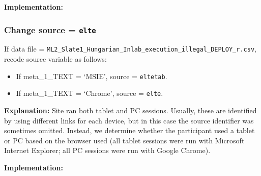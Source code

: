 \documentclass[]{article}
\newenvironment{Shaded}{\begin{snugshade}}{\end{snugshade}}
\newcommand{\DecValTok}[1]{\textcolor[rgb]{0.86,0.86,0.80}{{#1}}}
\newcommand{\StringTok}[1]{\textcolor[rgb]{0.80,0.58,0.58}{{#1}}}
\newcommand{\CommentTok}[1]{\textcolor[rgb]{0.50,0.62,0.50}{{#1}}}
\newcommand{\NormalTok}[1]{\textcolor[rgb]{0.80,0.80,0.80}{{#1}}}
\begin{document}
\textbf{Implementation:}

\begin{Shaded}
\end{Shaded}

\subsubsection{\textbf{Change} source =
\texttt{elte}}\label{change-source-elte}

If data file =
\texttt{ML2\_Slate1\_Hungarian\_Inlab\_execution\_illegal\_DEPLOY\_r.csv},
recode source variable as follows:

\begin{itemize}
\itemsep1pt\parskip0pt
\item
  If meta\_1\_TEXT = `MSIE', source = \texttt{eltetab}.
\item
  If meta\_1\_TEXT = `Chrome', source = \texttt{elte}.
\end{itemize}

\textbf{Explanation:} Site ran both tablet and PC sessions. Usually,
these are identified by using different links for each device, but in
this case the source identifier was sometimes omitted. Instead, we
determine whether the participant used a tablet or PC based on the
browser used (all tablet sessions were run with Microsoft Internet
Explorer; all PC sessions were run with Google Chrome).

\textbf{Implementation:}

\begin{Shaded}
\end{Shaded}
\end{document}
